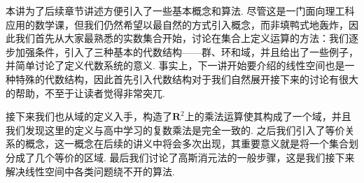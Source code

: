 \begin{summary}

    本讲为了后续章节讲述方便引入了一些基本概念和算法. 尽管这是一门面向理工科应用的数学课，但我们仍然希望以最自然的方式引入概念，而非填鸭式地轰炸，因此我们首先从大家最熟悉的实数集合开始，讨论在集合上定义运算的方法：我们逐步加强条件，引入了三种基本的代数结构——群、环和域，并且给出了一些例子，并简单讨论了定义代数系统的意义. 事实上，下一讲开始要介绍的线性空间也是一种特殊的代数结构，因此首先引入代数结构对于我们自然展开接下来的讨论有很大的帮助，不至于让读者觉得非常突兀.

    接下来我们也从域的定义入手，构造了$\mathbf{R}^2$上的乘法运算使其构成了一个域，并且我们发现这里的定义与高中学习的复数乘法是完全一致的. 之后我们引入了等价关系的概念，这一概念在后续的讲义中将会多次出现，其重要意义就是将一个集合划分成了几个等价的区域. 最后我们讨论了高斯消元法的一般步骤，这是我们接下来解决线性空间中各类问题绕不开的算法.

\end{summary}

